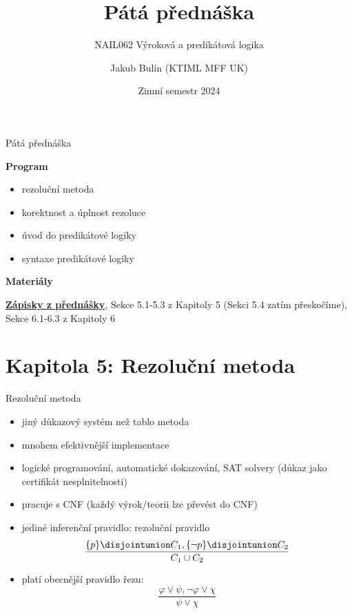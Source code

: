 \documentclass{beamer}
\title{Pátá přednáška}
\subtitle{NAIL062 Výroková a predikátová logika}
\author{Jakub Bulín (KTIML MFF UK)}
\date{Zimní semestr 2024}
\begin{document}
\maketitle


\begin{frame}{Pátá přednáška}

    \textbf{Program}
        \begin{itemize}
            \item rezoluční metoda
            \item korektnost a úplnost rezoluce
            \item úvod do predikátové logiky
            \item syntaxe predikátové logiky
        \end{itemize}

    \textbf{Materiály}

        \href{https://github.com/jbulin-mff-uk/nail062/raw/main/lecture/lecture-notes/lecture-notes.pdf}{\alert{\textbf{Zápisky z přednášky}}}, Sekce 5.1-5.3 z Kapitoly 5 (Sekci 5.4 zatím přeskočíme), Sekce 6.1-6.3 z Kapitoly 6

\end{frame}


\section{\sc Kapitola 5: Rezoluční metoda}


\begin{frame}{Rezoluční metoda}
    
    \begin{itemize}[<+->]
        \item jiný důkazový systém než tablo metoda
        \item mnohem efektivnější implementace
        \item logické programování, automatické dokazování, SAT solvery (důkaz jako \alert{certifikát} nesplnitelnosti)
        \item pracuje s CNF (každý výrok/teorii lze převést do CNF)
        \item jediné inferenční pravidlo: \alert{rezoluční pravidlo}
        $$
        \frac{\{p\}\disjointunion C_1,\{\neg p\}\disjointunion C_2}{C_1\cup C_2}
        $$
        \item platí obecnější \alert{pravidlo řezu}:
        $$
        \frac{\varphi\lor\psi,\neg\varphi\lor\chi}{\psi\lor\chi}
        $$
    \end{itemize}

\end{frame}
\end{document}
